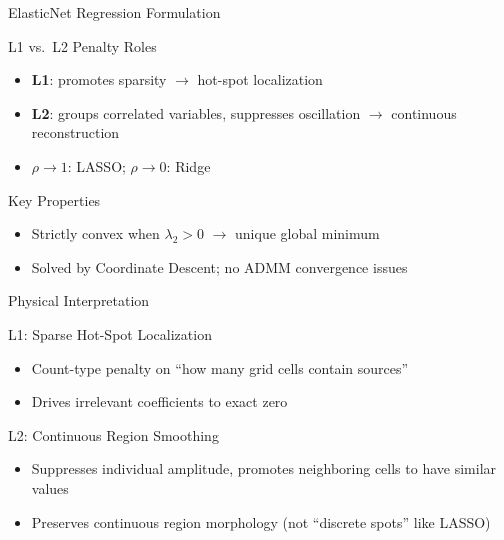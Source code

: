 \documentclass{sysupptthesis}
\begin{document}
\begin{frame}{ElasticNet Regression Formulation}

    \begin{block}{L1 vs.\ L2 Penalty Roles}
        \begin{itemize}\footnotesize
            \item \textbf{L1}: promotes sparsity $\rightarrow$ hot-spot localization
            \item \textbf{L2}: groups correlated variables, suppresses oscillation $\rightarrow$ continuous reconstruction
            \item $\rho \to 1$: LASSO; \quad $\rho \to 0$: Ridge
        \end{itemize}
    \end{block}

    \begin{block}{Key Properties}
        \begin{itemize}\footnotesize
            \item Strictly convex when $\lambda_2 > 0$ $\rightarrow$ unique global minimum
            \item Solved by Coordinate Descent; no ADMM convergence issues
        \end{itemize}
    \end{block}
\end{frame}

\begin{frame}{Physical Interpretation}
    \begin{block}{L1: Sparse Hot-Spot Localization}
        \begin{itemize}\footnotesize
            \item Count-type penalty on ``how many grid cells contain sources''
            \item Drives irrelevant coefficients to exact zero
        \end{itemize}
    \end{block}

    \begin{block}{L2: Continuous Region Smoothing}
        \begin{itemize}\footnotesize
            \item Suppresses individual amplitude, promotes neighboring cells to have similar values
            \item Preserves continuous region morphology (not ``discrete spots'' like LASSO)
        \end{itemize}
    \end{block}

\end{frame}
\end{document}
